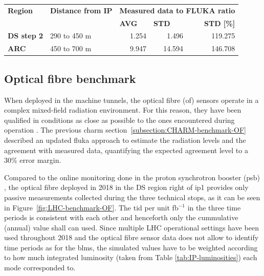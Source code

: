 \documentclass[encoding=utf8,british]{tumphthesis}
\begin{document}
\begin{table}[H]
    \bigskip

    \hfill

    \begin{subtable}{1.0\textwidth}
    \centering
    \label{tab:agreement-levels-BLMs-2018-ip5-2step}

\begin{tabular}{|l|l|rrr|}
\hline
\rowcolor[HTML]{CFE2F3} 
\textbf{Region}    & \textbf{Distance from IP} & \multicolumn{3}{c|}{\cellcolor[HTML]{CFE2F3}\textbf{Measured data to FLUKA ratio}}                                             \\
                   &               & \multicolumn{1}{l}{\textbf{AVG}} & \multicolumn{1}{l}{\textbf{STD}} & \multicolumn{1}{r|}{\textbf{STD {[}\%{]}}} \\
\hline
\rowcolor[HTML]{CFE2F3} 
\textbf{DS step 2} & 290 to 450 m  & 1.254                             & 1.496                            & 119.275                                   \\
\textbf{ARC}       & 450 to 700 m  & 9.947                             & 14.594                           & 146.708                                   \\ \hline
\end{tabular}
\end{subtable}

\end{table}


\subsection{Optical fibre benchmark}

When deployed in the machine tunnels, the optical fibre (\acrshort{of}) sensors operate in a complex mixed-field radiation environment. For this reason, they have been qualified in conditions as close as possible to the ones encountered during operation \cite{Diego:OF, Henschel:2004de}. The previous \acrshort{charm} section~\ref{subsection:CHARM-benchmark-OF} described an updated \acrshort{fluka} approach to estimate the radiation levels and the agreement with measured data, quantifying the expected agreement level to a 30\% error margin.

Compared to the online monitoring done in the proton synchrotron booster (\acrshort{psb}) \cite{DiFrancesca:2644042}, the optical fibre deployed in 2018 in the DS region right of \acrshort{ip}1 provides only passive measurements collected during the three technical stops, as it can be seen in Figure~\ref{fig:LHC-benchmark-OF}. The \acrshort{tid} per unit fb$^{-1}$ in the three time periods is consistent with each other and henceforth only the cummulative (annual) value shall can used. Since multiple LHC operational settings have been used throughout 2018 and the optical fibre sensor data does not allow to identify time periods as for the \acrshort{blm}s, the simulated values have to be weighted according to how much integrated luminosity (taken from Table \ref{tab:IP-luminosities}) each mode corresponded to.
\end{document}
